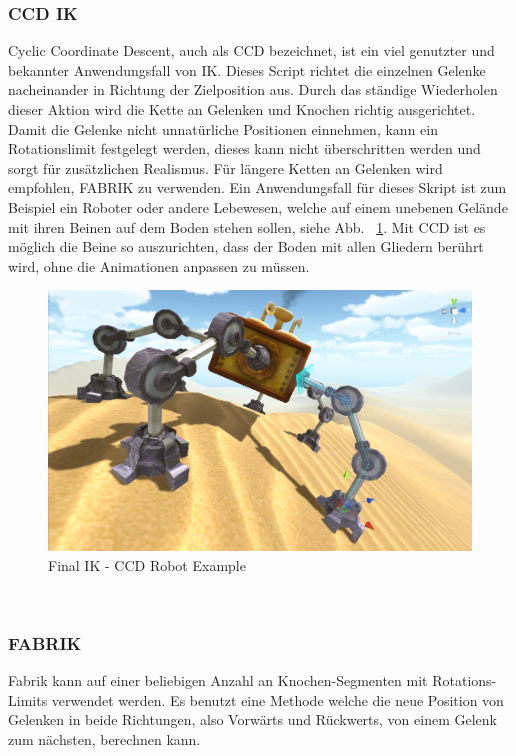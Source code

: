 \subsubsection{CCD IK}
Cyclic Coordinate Descent, auch als CCD bezeichnet, ist ein viel genutzter und bekannter Anwendungsfall von IK.
Dieses Script richtet die einzelnen Gelenke nacheinander in Richtung der Zielposition aus.
Durch das ständige Wiederholen dieser Aktion wird die Kette an Gelenken und Knochen richtig ausgerichtet.
Damit die Gelenke nicht unnatürliche Positionen einnehmen, kann ein Rotationslimit festgelegt werden, dieses kann nicht überschritten werden und sorgt für zusätzlichen Realismus.
Für längere Ketten an Gelenken wird empfohlen, FABRIK zu verwenden.
Ein Anwendungsfall für dieses Skript ist zum Beispiel ein Roboter oder andere Lebewesen, welche auf einem unebenen Gelände mit ihren Beinen auf dem Boden stehen sollen, siehe Abb. ~\ref{fig:finalIK_ccd_robot_example}.
Mit CCD ist es möglich die Beine so auszurichten, dass der Boden mit allen Gliedern berührt wird, ohne die Animationen anpassen zu müssen.
\begin {figure}
    \centering
    \includegraphics[scale=0.4]{pics/finalik_ccd}
    \caption{Final IK - CCD Robot Example}
    \label{fig:finalIK_ccd_robot_example}
\end {figure}
~\cite{FinalIK_CCD_2021}

\subsubsection{FABRIK}
Fabrik kann auf einer beliebigen Anzahl an Knochen-Segmenten mit Rotations-Limits verwendet werden.
Es benutzt eine Methode welche die neue Position von Gelenken in beide Richtungen, also Vorwärts und Rückwerts,
von einem Gelenk zum nächsten, berechnen kann.

